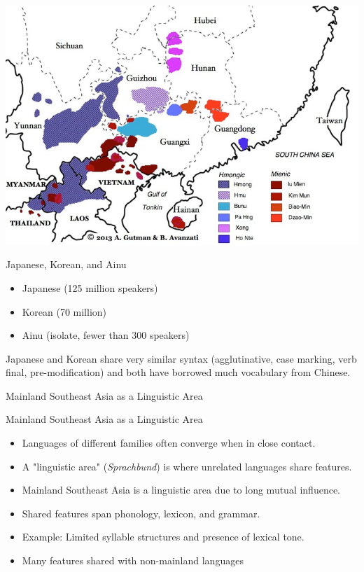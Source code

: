 \documentclass{beamer}
\begin{document}
\begin{frame}
  \begin{center}
    \includegraphics[height=0.9\textheight]{pics/image8.png}
  \end{center}
\end{frame}

\begin{frame}{Japanese, Korean, and Ainu}
  \begin{itemize}
  \item Japanese (125 million speakers)
  \item Korean (70 million)
  \item Ainu (isolate, fewer than 300 speakers) 
  \end{itemize}

Japanese and Korean share very similar syntax (agglutinative, case marking, verb final, pre-modification) and both have borrowed much vocabulary from Chinese.
  
\end{frame}
\begin{frame}
  \begin{center}
    \huge Mainland Southeast Asia as a Linguistic Area
  \end{center}
\end{frame}

\begin{frame}{Mainland Southeast Asia as a Linguistic Area}
    \begin{itemize}
        \item Languages of different families often converge when in close contact.
        \item A "linguistic area" (\textit{Sprachbund}) is where unrelated languages share features.
        \item Mainland Southeast Asia is a linguistic area due to long mutual influence.
        \item Shared features span phonology, lexicon, and grammar.
        \item Example: Limited syllable structures and presence of lexical tone.
        \item Many features shared with non-mainland languages
    \end{itemize}
\end{frame}
\end{document}
